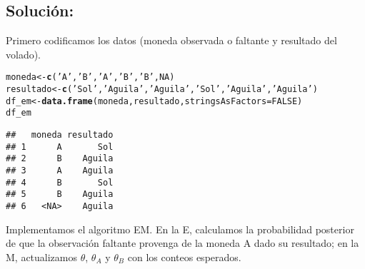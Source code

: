 \documentclass[paper=letter, fontsize=11pt, draft=false]{scrartcl}\usepackage[]{graphicx}\usepackage[]{xcolor}
\makeatletter
\newcommand{\hlnum}[1]{\textcolor[rgb]{0.686,0.059,0.569}{#1}}%
\newcommand{\hlsng}[1]{\textcolor[rgb]{0.192,0.494,0.8}{#1}}%
\newcommand{\hldef}[1]{\textcolor[rgb]{0.345,0.345,0.345}{#1}}%
\newcommand{\hlkwb}[1]{\textcolor[rgb]{0.69,0.353,0.396}{#1}}%
\newcommand{\hlkwc}[1]{\textcolor[rgb]{0.333,0.667,0.333}{#1}}%
\newcommand{\hlkwd}[1]{\textcolor[rgb]{0.737,0.353,0.396}{\textbf{#1}}}%
\newenvironment{kframe}{%
 \def\at@end@of@kframe{}%
 \ifinner\ifhmode%
  \def\at@end@of@kframe{\end{minipage}}%
  \begin{minipage}{\columnwidth}%
 \fi\fi%
 \def\FrameCommand##1{\hskip\@totalleftmargin \hskip-\fboxsep
 \colorbox{shadecolor}{##1}\hskip-\fboxsep
     \hskip-\linewidth \hskip-\@totalleftmargin \hskip\columnwidth}%
 \MakeFramed {\advance\hsize-\width
   \@totalleftmargin\z@ \linewidth\hsize
   \@setminipage}}%
 {\par\unskip\endMakeFramed%
 \at@end@of@kframe}
\newenvironment{knitrout}{}{} %
\numberwithin{equation}{problemcounter} %
\numberwithin{figure}{problemcounter} %
\numberwithin{table}{problemcounter} %
\numberwithin{subsection}{problemcounter}
\makeatother
\begin{document}
\subsection{\textbf{Solución:}}

Primero codificamos los datos (moneda observada o faltante y resultado del volado).

\begin{knitrout}
\color{fgcolor}\begin{kframe}
\begin{alltt}
\hldef{moneda} \hlkwb{<-} \hlkwd{c}\hldef{(}\hlsng{'A'}\hldef{,}\hlsng{'B'}\hldef{,}\hlsng{'A'}\hldef{,}\hlsng{'B'}\hldef{,}\hlsng{'B'}\hldef{,} \hlnum{NA}\hldef{)}
\hldef{resultado} \hlkwb{<-} \hlkwd{c}\hldef{(}\hlsng{'Sol'}\hldef{,}\hlsng{'Aguila'}\hldef{,}\hlsng{'Aguila'}\hldef{,}\hlsng{'Sol'}\hldef{,}\hlsng{'Aguila'}\hldef{,}\hlsng{'Aguila'}\hldef{)}
\hldef{df_em} \hlkwb{<-} \hlkwd{data.frame}\hldef{(moneda, resultado,} \hlkwc{stringsAsFactors} \hldef{=} \hlnum{FALSE}\hldef{)}
\hldef{df_em}
\end{alltt}
\begin{verbatim}
##   moneda resultado
## 1      A       Sol
## 2      B    Aguila
## 3      A    Aguila
## 4      B       Sol
## 5      B    Aguila
## 6   <NA>    Aguila
\end{verbatim}
\end{kframe}
\end{knitrout}

Implementamos el algoritmo EM. En la E, calculamos la probabilidad posterior de que la observación faltante provenga de la moneda A dado su resultado; en la M, actualizamos
\(\theta\), \(\theta_A\) y \(\theta_B\) con los conteos esperados.
\end{document}
